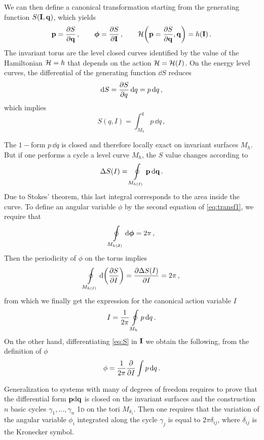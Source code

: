 We can then define a canonical transformation starting from the generating function $S(\vb{I},\vb{q})$, which yields
%
\begin{equation}
  \vb{p}=\pdv{S}{\vb{q}}\,, \qquad \boldsymbol{\phi}=\pdv{S}{\vb{I}}\,, \qquad \mathcal{H}\qty(\vb{p}=\pdv{S}{\vb{q}},\vb{q}) = h(\vb{I})\,.
  \label{eq:transf1}
  \end{equation} 
%
The invariant torus are the level closed curves identified by the value of the Hamiltonian $\mathcal{H}=h$ that depends on the action $\mathcal{H}=\mathcal{H}(I)$. On the energy level curves, the differential of the generating function $\dd S$ reduces
%
\begin{equation} 
    \dd S = \pdv{S}{q}\,\dd q = p\,\dd q\,,
\end{equation} 
%
which implies
%
\begin{equation}
    S(q,I) = \int_{M_h}^q p\, \dd q\,,
    \label{eq:S}
\end{equation} 
%

The $1-$form $p\,\dd q$ is closed and therefore locally exact on invariant surfaces $M_h$. But if one performs a cycle a level curve $M_h$, the $S$ value changes according to
%
\begin{equation}
    \Delta S(I) = \oint\displaylimits_{M_{h(I)}} \vb{p}\, \dd \vb{q} \,.
\end{equation} 
%
Due to Stokes' theorem, this last integral corresponds to the area inside the curve.  To define an angular variable $\phi$ by the second equation of \eqref{eq:transf1}, we require that
%
\begin{equation} 
    \oint\displaylimits_{M_{h(\vb{J})}} \dd\boldsymbol{\phi} = 2\pi\,,  
\end{equation} 
%
Then the periodicity of $\phi$ on the torus implies
%
\begin{equation} 
    \oint\displaylimits_{M_{h(I)}} \dd\qty(\pdv{S}{I}) = \pdv{\Delta S(I)}{I} = 2\pi\,, 
\end{equation}
%
from which we finally get the expression for the canonical action variable $I$
%
\begin{equation}  
    I = \frac{1}{2\pi}\oint\displaylimits_{M_h} p\,\dd q\,.  
\end{equation} 
%
On the other hand, differentiating \eqref{eq:S} in $\vb{I}$ we obtain the following, from the definition of $\phi$
%
\begin{equation} 
    \phi = \frac{1}{2\pi} \pdv{I}\int p\,\dd q\, . 
\end{equation}  

Generalization to systems with many of degrees of freedom requires to prove that the differential form $\vb{p}\dd \vb{q}$ is closed on the invariant surfaces and the construction $n$ basic cycles $\gamma_1,\dots, \gamma_n$ 1\textsc{d} on the tori $M_{k_i}$. Then one requires that the variation of the angular variable $\phi_i$ integrated along the cycle $\gamma_j$ is equal to $2\pi\delta_{ij}$, where $\delta_{ij}$ is the Kronecker symbol.

